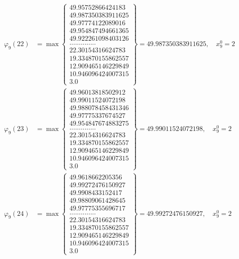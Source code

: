 \documentclass{article}
\begin{document}
\begin{align*}
  
  
  
\varphi_{9}(22) &= \max \left\{ \begin{array}{c}
49.95752866424183 \\
 49.987350383911625 \\
 49.97774122089016 \\
 49.954847494661365 \\
 49.922261098403126 \\
 .............. \\
 22.30154316624783 \\
 19.334870155862557 \\
 12.909465146229849 \\
 10.946096424007315 \\
 3.0
\end{array} \right\} = 49.987350383911625, \quad x_{9}^0 = 2\\
  
  
  
  
\varphi_{9}(23) &= \max \left\{ \begin{array}{c}
49.96013818502912 \\
 49.99011524072198 \\
 49.988078458431346 \\
 49.97775337674527 \\
 49.954847674883275 \\
 .............. \\
 22.30154316624783 \\
 19.334870155862557 \\
 12.909465146229849 \\
 10.946096424007315 \\
 3.0
\end{array} \right\} = 49.99011524072198, \quad x_{9}^0 = 2\\
  
  
  
  
\varphi_{9}(24) &= \max \left\{ \begin{array}{c}
49.9618662205356 \\
 49.99272476150927 \\
 49.9908433152417 \\
 49.98809061428645 \\
 49.97775355696717 \\
 .............. \\
 22.30154316624783 \\
 19.334870155862557 \\
 12.909465146229849 \\
 10.946096424007315 \\
 3.0
\end{array} \right\} = 49.99272476150927, \quad x_{9}^0 = 2\\
  

\end{align*}
\end{document}
